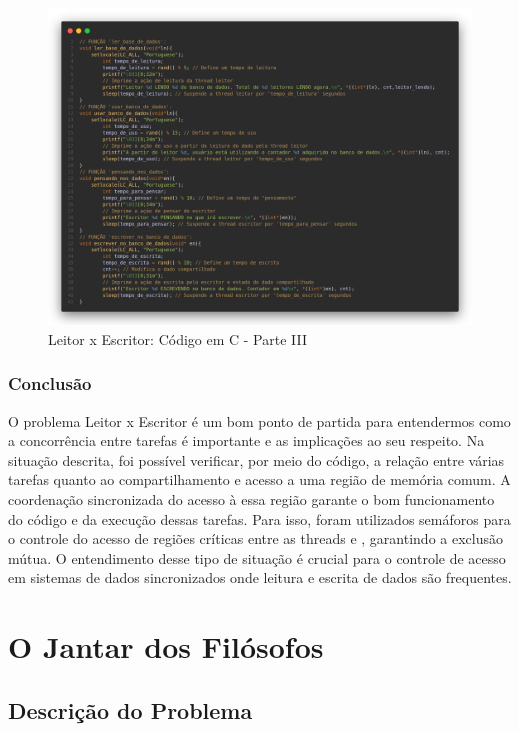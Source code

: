 \documentclass[
	12pt,				%
	openright,			%
	oneside,			%
	a4paper,			%
	chapter=TITLE,		%
	english,			%
	french,				%
	spanish,			%
	brazil				%
	]{abntex2}
\theoremstyle{definition}
\begin{document}
\begin{figure}[ht]
    \centering
    \includegraphics[width=1.0\textwidth]{imagens/leitor_escritor_3.png}
    \caption{Leitor x Escritor: Código em C - Parte III}
    \label{fig:4}
\end{figure}

\clearpage
\subsection {Conclusão}

O problema Leitor x Escritor é um bom ponto de partida para entendermos como a concorrência entre tarefas é importante e as implicações ao seu respeito. Na situação descrita, foi possível verificar, por meio do código, a relação entre várias tarefas quanto ao compartilhamento e acesso a uma região de memória comum. A coordenação sincronizada do acesso à essa região garante o bom funcionamento do código e da execução dessas tarefas. Para isso, foram utilizados semáforos para o controle do acesso de regiões críticas entre as threads  e , garantindo a exclusão mútua. O entendimento desse tipo de situação é crucial para o controle de acesso em sistemas de dados sincronizados onde leitura e escrita de dados são frequentes.

\chapter{O Jantar dos Filósofos}
\section {Descrição do Problema}
\end{document}
